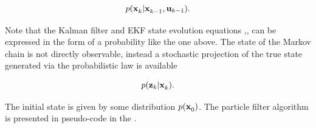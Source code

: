 \begin{equation}
p( \x{k}{}{} | \x{k-1}{}{}, \U{k-1}).
\label{eqn:pf_px}
\end{equation}

Note that the Kalman filter and EKF state evolution equations
,, can be
expressed in the form of a probability like the one above. The state
of the Markov chain is not directly observable, instead a stochastic
projection  of the true state  generated via the
probabilistic law is available

\begin{equation}
p (\z{k} | \x{k}{}{}).
\label{eqn:pf_pz}
\end{equation}

The initial state  is given by some distribution
$p(\x{0}{}{})$. The particle filter algorithm is presented in
pseudo-code in the .

